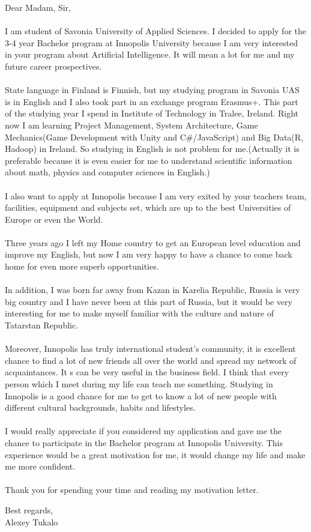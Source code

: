 \documentclass[english]{article}
\begin{document}
\newpage
\setcounter{page}{1}
\setcounter{tocdepth}{2}
Dear Madam, Sir,\\\\
I am student of Savonia University of Applied Sciences. I decided to apply for the 3-4 year Bachelor program at Innopolis University because I am very interested in your program about Artificial Intelligence. It will mean a lot for me and my future career prospectives.\\\\
State language in Finland is Finnish, but my studying program in Savonia UAS is in English and I also took part in an exchange program Erasmus+. This part of the studying year I spend in Institute of Technology in Tralee, Ireland. Right now I am learning Project Management, System Architecture, Game Mechanics(Game Development with Unity and C\#/JavaScript) and Big Data(R, Hadoop) in Ireland. So studying in English is not problem for me.(Actually it is preferable because it is even easier for me to understand scientific information about math, physics and computer sciences in English.)\\\\
I also want to apply at Innopolis because I am very exited by your teachers team, facilities, equipment and subjects set, which are up to the best Universities of Europe or even the World. \\\\
Three years ago I left my Home country to get an European level education and improve my English, but now I am very happy to have a chance to come back home for even more superb opportunities.\\\\
In addition, I was born far away from Kazan in Karelia Republic, Russia is very big country and I have never been at this part of Russia, but it would be very interesting for me to make myself familiar with the culture and nature of Tatarstan Republic.\\\\
Moreover, Innopolis has truly international student's community, it is excellent chance to find a lot of new friends all over the world and spread my network of acquaintances. It s can be very useful in the business field. I think that every person which I meet during my life can teach me something. Studying in Innopolis is a good chance for me to get to know a lot of new people with different cultural backgrounds, habits and lifestyles. \\\\
I would really appreciate if you considered my application and gave me the chance to participate in the Bachelor program at Innopolis University. This experience would be a great motivation for me, it would change my life and make me more confident. \\\\
Thank you for spending your time and reading my motivation letter.
\begin{flushright}
Best regards, \\
Alexey Tukalo
\end{flushright}
\end{document}
